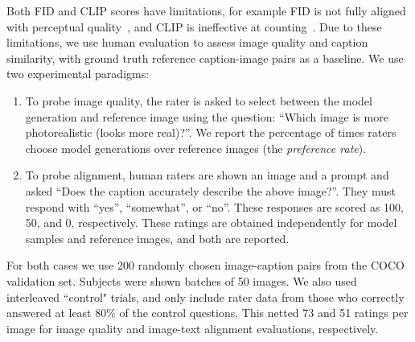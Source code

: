 Both FID and CLIP scores have limitations, for example FID is not fully aligned with perceptual quality~\cite{parmar-cvpr-2022}, and CLIP is ineffective at counting~\cite{radford-icml-2021}. Due to these limitations, we use human evaluation to assess image quality and caption similarity, with ground truth reference caption-image pairs as a baseline. We use two experimental paradigms:

\begin{enumerate}[noitemsep,nolistsep,leftmargin=0.5cm]
    \item To probe image quality, the rater is asked to select between the model generation and reference image using the question: ``Which image is more photorealistic (looks more real)?''. We report the percentage of times raters choose model generations over reference images (the \emph{preference rate}). 

    \item To probe alignment, human raters are shown an image and a prompt and asked ``Does the caption accurately describe the above image?''. They must respond with ``yes'', ``somewhat'', or ``no''. These responses are scored as 100, 50, and 0, respectively. These ratings are obtained independently for model samples and  reference images, and both are reported.
\end{enumerate}

For both cases we use 200 randomly chosen image-caption pairs from the COCO validation set. Subjects were shown batches of 50 images. We also used interleaved ``control" trials, and only include rater data from those who correctly answered at least 80\% of the control questions. This netted 73 and 51 ratings per image for image quality and image-text alignment evaluations, respectively.

